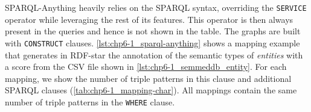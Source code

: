 \begin{table}[t!]
    \caption[Characteristics of evaluation mapping]{Characteristics of mappings in RML and SPARQL-Anything. \#TM stands for number of Triples Map, \#POM for Predicate Object Map, and \#TP for Triple Patterns. The shown operators appear usually in the \texttt{WHERE} clause; the ones marked with $^c$ appear in the \texttt{CONSTRUCT} clause. }
    \label{tab:chp6-1_mapping-char}
    \centering
\end{table}

SPARQL-Anything heavily relies on the SPARQL syntax, overriding the \texttt{SERVICE} operator while leveraging the rest of its features. This operator is then always present in the queries and hence is not shown in the table. The graphs are built with \texttt{CONSTRUCT} clauses. \cref{lst:chp6-1_sparql-anything} shows a mapping example that generates in RDF-star the annotation of the semantic types of \textit{entities} with a score from the CSV file shown in \cref{lst:chp6-1_semmeddb_entity}.
For each mapping, we show the number of triple patterns in this clause and additional SPARQL clauses (\cref{tab:chp6-1_mapping-char}). All mappings contain the same number of triple patterns in the \texttt{WHERE} clause.




